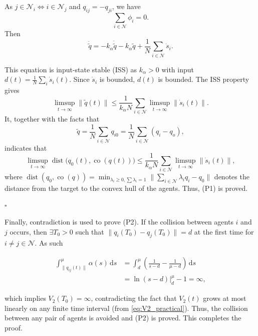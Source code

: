 As $j\in\mathcal{N}_{i}\Leftrightarrow i\in\mathcal{N}_{j}$ and $q_{ij}=-q_{ji}$, we have
\begin{equation*}\label{eq:sum_phi}
	\sum_{i\in\mathcal{N}}\phi_{i}=0.
\end{equation*}
Then
\begin{equation*}\label{eq:q_tilde_ddot_simplified}
	\ddot{\tilde{q}}=-k_\alpha \dot{\tilde{q}} -k_\alpha\tilde{q}+\frac{1}{N}\sum_{i\in\mathcal{N}}\dot{s}_i.
\end{equation*}

This equation is input-state stable (ISS) as $k_{\alpha}>0$ with input $d(t)=\frac{1}{N}\sum_i\dot{s}_i(t)$. Since $\dot{s}_i$ is bounded, $d(t)$ is bounded. The ISS property gives
\begin{equation*}\label{eq:q_tilde_bound}
	\limsup_{t\to\infty} \|\tilde{q}(t)\| \leq \frac{1}{k_\alpha N}\sum_{i\in\mathcal{N}} \limsup_{t\to\infty} \|\dot{s}_i(t)\|.
\end{equation*}
It, together with the facts that
\begin{equation*}\label{eq:q_tilde_meaning}
	\tilde{q}=\frac{1}{N}\sum_{i\in\mathcal{N}}q_{i0}=\frac{1}{N}\sum_{i\in\mathcal{N}}(q_{i}-q_{o}),
\end{equation*}
indicates that
\begin{equation*}
	\limsup_{t\to\infty}\operatorname{dist}\bigl(q_0(t),\operatorname{co}(q(t))\bigr) \leq \frac{1}{k_\alpha N}\sum_{i\in\mathcal{N}} \limsup_{t\to\infty} \|\dot{s}_i(t)\|,
\end{equation*}
where $\operatorname{dist}(q_0,\operatorname{co}(q)) = \min_{\lambda_i\geq0,\sum\lambda_i=1} \|\sum_{i\in\mathcal{N}} \lambda_i q_i - q_0\|$ denotes the distance from the target to the convex hull of the agents.
Thus, (P1) is proved.

\hfill$\square$

Finally, contradiction is used to prove (P2). If the collision between agents $i$ and $j$ occurs, then $\exists T_0 > 0$ such that $\|q_i(T_0) - q_j(T_0)\| = d$ at the first time for $i \neq j \in \mathcal{N}$. As such

\[
\begin{aligned}
	\int_{\|q_{ij}(t)\|}^{\mu} \alpha(s)\, \mathrm{d}s &= \int_{d}^{\mu} \left(\frac{1}{s - d} - \frac{1}{\mu - d}\right)\, \mathrm{d}s \\
	&= \ln(s - d)\Big|_{d}^{\mu} - 1 = \infty,
\end{aligned}
\]

which implies $V_2(T_0) = \infty$, contradicting the fact that $V_2(t)$ grows at most linearly on any finite time interval (from \eqref{eq:V2_practical}). Thus, the collision between any pair of agents is avoided and (P2) is proved. This completes the proof.